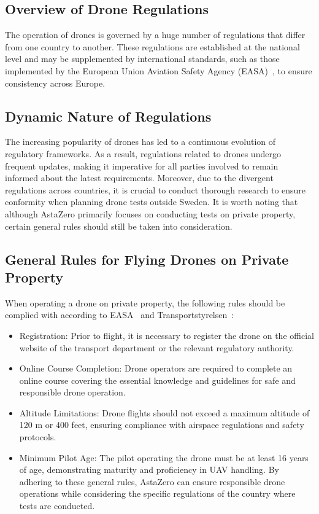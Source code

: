 \subsection{Overview of Drone Regulations}
The operation of drones is governed by a huge number of regulations that differ from one country to another. These regulations are established at the national level and may be supplemented by international standards, such as those implemented by the European Union Aviation Safety Agency (EASA)~\cite{PublicationofficeoftheEuropeanUnion2019CommissionSystems}, to ensure consistency across Europe.

\subsection{Dynamic Nature of Regulations}
The increasing popularity of drones has led to a continuous evolution of regulatory frameworks. As a result, regulations related to drones undergo frequent updates, making it imperative for all parties involved to remain informed about the latest requirements. Moreover, due to the divergent regulations across countries, it is crucial to conduct thorough research to ensure conformity when planning drone tests outside Sweden. It is worth noting that although AstaZero primarily focuses on conducting tests on private property, certain general rules should still be taken into consideration.

\subsection{General Rules for Flying Drones on Private Property}
When operating a drone on private property, the following rules should be complied with according to EASA~\cite{PublicationofficeoftheEuropeanUnion2019CommissionSystems} and Transportstyrelsen~\cite{TransportstyrelsenDronesAircraft}:\\
\begin{itemize}
    \item 
Registration: Prior to flight, it is necessary to register the drone on the official website of the transport department or the relevant regulatory authority.
\item Online Course Completion: Drone operators are required to complete an online course covering the essential knowledge and guidelines for safe and responsible drone operation.
\item Altitude Limitations: Drone flights should not exceed a maximum altitude of 120 m or 400 feet, ensuring compliance with airspace regulations and safety protocols.
\item Minimum Pilot Age: The pilot operating the drone must be at least 16 years of age, demonstrating maturity and proficiency in UAV handling.
By adhering to these general rules, AstaZero can ensure responsible drone operations while considering the specific regulations of the country where tests are conducted.
\end{itemize}

